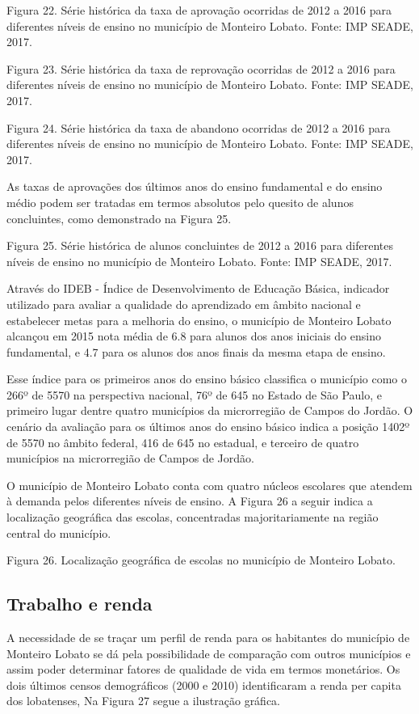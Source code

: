 Figura 22. Série histórica da taxa de aprovação ocorridas de 2012 a 2016 para diferentes níveis de ensino no município de Monteiro Lobato.
Fonte: IMP SEADE, 2017.

Figura 23. Série histórica da taxa de reprovação ocorridas de 2012 a 2016 para diferentes níveis de ensino no município de Monteiro Lobato.
Fonte: IMP SEADE, 2017.

Figura 24. Série histórica da taxa de abandono ocorridas de 2012 a 2016 para diferentes níveis de ensino no município de Monteiro Lobato.
Fonte: IMP SEADE, 2017.

As taxas de aprovações dos últimos anos do ensino fundamental e do ensino médio podem ser tratadas em termos absolutos pelo quesito de alunos concluintes, como demonstrado na Figura 25.

Figura 25. Série histórica de alunos concluintes de 2012 a 2016 para diferentes níveis de ensino no município de Monteiro Lobato.
Fonte: IMP SEADE, 2017.

Através do IDEB - Índice de Desenvolvimento de Educação Básica, indicador utilizado para avaliar a qualidade do aprendizado em âmbito nacional e estabelecer metas para a melhoria do ensino, o município de Monteiro Lobato alcançou em 2015 nota média de 6.8 para alunos dos anos iniciais do ensino fundamental, e 4.7 para os alunos dos anos finais da mesma etapa de ensino.

Esse índice para os primeiros anos do ensino básico classifica o município como o 266º de 5570 na perspectiva nacional, 76º de 645 no Estado de São Paulo, e primeiro lugar dentre quatro municípios da microrregião de Campos do Jordão. O cenário da avaliação para os últimos anos do ensino básico indica a posição 1402º de 5570 no âmbito federal, 416 de 645 no estadual, e terceiro de quatro municípios na microrregião de Campos de Jordão.
	
O município de Monteiro Lobato conta com quatro núcleos escolares que atendem à demanda pelos diferentes níveis de ensino. A Figura 26 a seguir indica a localização geográfica das escolas, concentradas majoritariamente na região central do município. 
 
Figura 26. Localização geográfica de escolas no município de Monteiro Lobato.

\subsection{Trabalho e renda}

A necessidade de se traçar um perfil de renda para os habitantes do município de Monteiro Lobato se dá pela possibilidade de comparação com outros municípios e assim poder determinar fatores de qualidade de vida em termos monetários. Os dois últimos censos demográficos (2000 e 2010) identificaram a renda per capita dos lobatenses, Na Figura 27 segue a ilustração gráfica.
 
